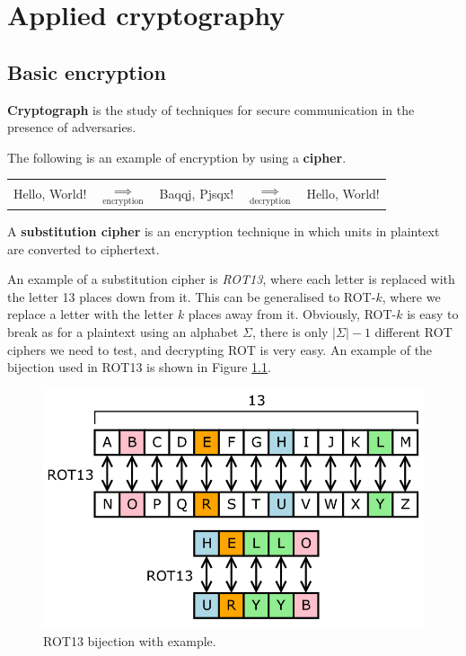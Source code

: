 \chapter{Applied cryptography}

\section{Basic encryption}

\begin{definition}[Cryptography]
    \textbf{Cryptograph} is the study of techniques for secure communication in the presence of adversaries.
\end{definition}

\begin{example}[Encryption]
    The following is an example of encryption by using a \textbf{cipher}.
    \begin{center}
        \begin{tabular}{ccccc}
            Hello, World! & $\underset{\text{encryption}}{\implies}$ & Baqqj, Pjsqx! & $\underset{\text{decryption}}{\implies}$ & Hello, World!
        \end{tabular}
    \end{center}
\end{example}

\begin{definition}
    A \textbf{substitution cipher} is an encryption technique in which units in plaintext are converted to ciphertext.
\end{definition}

\begin{example}[ROT13]
    An example of a substitution cipher is \emph{ROT13}, where each letter is replaced with the letter 13 places down from it. This can be generalised to ROT-$k$, where we replace a letter with the letter $k$ places away from it. Obviously, ROT-$k$ is easy to break as for a plaintext using an alphabet $\Sigma$, there is only $\lvert \Sigma \rvert - 1$ different ROT ciphers we need to test, and decrypting ROT is very easy. An example of the bijection used in ROT13 is shown in Figure \ref{fig:rot13}.
\end{example}

\begin{figure}
    \centering
    \includegraphics[width=0.8\linewidth]{images/rot13.png}
    \caption{ROT13 bijection with example.}
    \label{fig:rot13}
\end{figure}

